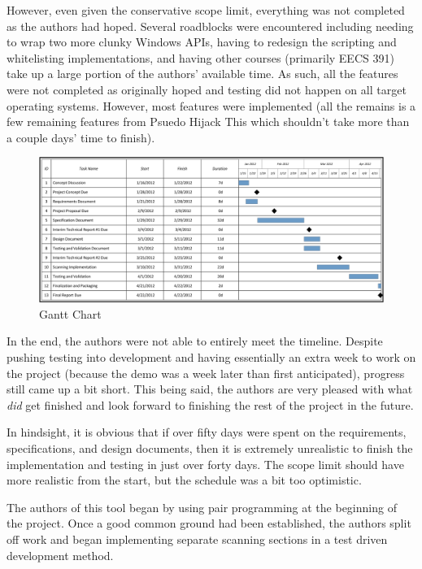 \documentclass[letterpaper,12pt]{article}
\begin{document}
However, even given the conservative scope limit, everything was not completed
as the authors had hoped.  Several roadblocks were encountered including needing
to wrap two more clunky Windows APIs, having to redesign the scripting and
whitelisting implementations, and having other courses (primarily EECS 391) take
up a large portion of the authors' available time.  As such, all the features
were not completed as originally hoped and testing did not happen on all target
operating systems.  However, most features were implemented (all the remains is
a few remaining features from Psuedo Hijack This which shouldn't take more than
a couple days' time to finish).

\begin{figure}[h]
  	\centering
	\includegraphics[scale=.7]{figures/GanttChart.png}
  	\caption{Gantt Chart}
  	\label{gantt}
\end{figure}

In the end, the authors were not able to entirely meet the timeline.  Despite
pushing testing into development and having essentially an extra week to work on
the project (because the demo was a week later than first anticipated), progress
still came up a bit short.  This being said, the authors are very pleased with
what \textit{did} get finished and look forward to finishing the rest of the
project in the future.  

In hindsight, it is obvious that if over fifty days were spent on the
requirements, specifications, and design documents, then it is extremely
unrealistic to finish the implementation and testing in just over forty days. 
The scope limit should have more realistic from the start, but the schedule was
a bit too optimistic.

The authors of this tool began by using pair programming at the beginning of the
project.  Once a good common ground had been established, the authors split off
work and began implementing separate scanning sections in a test driven
development method.  
\end{document}
